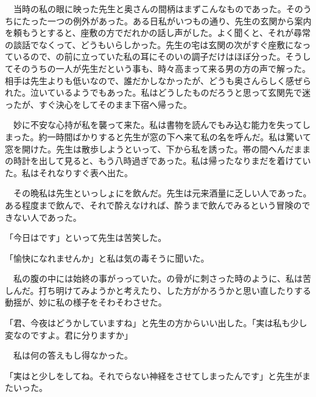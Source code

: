 \documentclass[a4j,onecolumn]{tarticle}
\begin{document}
　当時の私の眼に映った先生と奥さんの間柄はまずこんなものであった。\hbox{}そのうちにたった一つの例外があった。\hbox{}ある日私がいつもの通り、\hbox{}先生の玄関から案内を頼もうとすると、\hbox{}座敷の方でだれかの話し声がした。\hbox{}よく聞くと、\hbox{}それが尋常の談話でなくって、\hbox{}どうもいらしかった。\hbox{}先生の宅は玄関の次がすぐ座敷になっているので、\hbox{}の前に立っていた私の耳にそのいの調子だけはほぼ分った。\hbox{}そうしてそのうちの一人が先生だという事も、\hbox{}時々高まって来る男の方の声で解った。\hbox{}相手は先生よりも低いなので、\hbox{}誰だかしなかったが、\hbox{}どうも奥さんらしく感ぜられた。\hbox{}泣いているようでもあった。\hbox{}私はどうしたものだろうと思って玄関先で迷ったが、\hbox{}すぐ決心をしてそのまま下宿へ帰った。\hbox{}\par{}
　妙に不安な心持が私を襲って来た。\hbox{}私は書物を読んでもみ込む能力を失ってしまった。\hbox{}約一時間ばかりすると先生が窓の下へ来て私の名を呼んだ。\hbox{}私は驚いて窓を開けた。\hbox{}先生は散歩しようといって、\hbox{}下から私を誘った。\hbox{}帯の間へんだままの時計を出して見ると、\hbox{}もう八時過ぎであった。\hbox{}私は帰ったなりまだを着けていた。\hbox{}私はそれなりすぐ表へ出た。\hbox{}\par{}
　その晩私は先生といっしょにを飲んだ。\hbox{}先生は元来酒量に乏しい人であった。\hbox{}ある程度まで飲んで、\hbox{}それで酔えなければ、\hbox{}酔うまで飲んでみるという冒険のできない人であった。\hbox{}\par{}
「今日はです」といって先生は苦笑した。\hbox{}\par{}
「愉快になれませんか」と私は気の毒そうに聞いた。\hbox{}\par{}
　私の腹の中には始終の事がっっていた。\hbox{}の骨がに刺さった時のように、\hbox{}私は苦しんだ。\hbox{}打ち明けてみようかと考えたり、\hbox{}した方がかろうかと思い直したりする動揺が、\hbox{}妙に私の様子をそわそわさせた。\hbox{}\par{}
「君、\hbox{}今夜はどうかしていますね」と先生の方からいい出した。\hbox{}「実は私も少し変なのですよ。\hbox{}君に分りますか」\par{}
　私は何の答えもし得なかった。\hbox{}\par{}
「実はと少しをしてね。\hbox{}それでらない神経をさせてしまったんです」と先生がまたいった。\hbox{}\par{}
\end{document}
